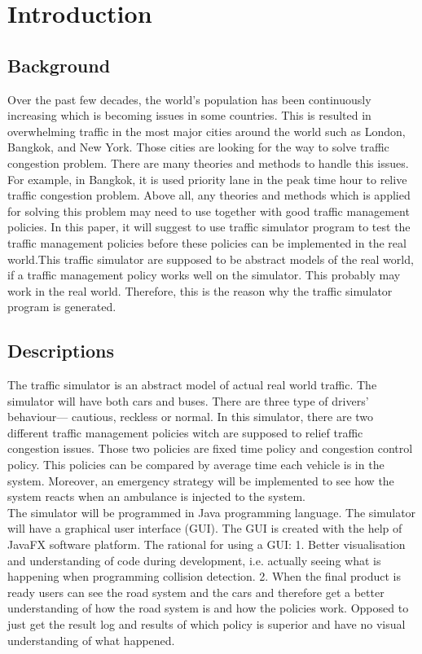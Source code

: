 \documentclass[11pt]{article}
\begin{document}
\newpage

\section{Introduction}
	\subsection{Background}
	\indent\indent Over the past few decades, the world’s population has been continuously increasing which is becoming issues in some countries. This is resulted in overwhelming traffic in the most major cities around the world such as London, Bangkok, and New York. Those cities are looking for the way to solve traffic congestion problem. There are many theories and methods to handle this issues. For example, in Bangkok, it is used priority lane in the peak time hour to relive traffic congestion problem.  Above all, any theories and methods which is applied for solving this problem may need to use together with good traffic management policies. In this paper, it will suggest to use traffic simulator program to test the traffic management policies before these policies can be implemented in the real world.This traffic simulator are supposed to be abstract models of the real world, if a traffic management policy works well on the simulator. This probably may work in the real world.  Therefore, this is the reason why the traffic simulator program is generated. 
	
	\subsection{Descriptions}
	\indent\indent The traffic simulator is an abstract model of actual real world traffic. The simulator will have both cars and buses. There are three type of drivers’ behaviour— cautious, reckless or normal. In this simulator, there are two different traffic management policies witch are supposed to relief traffic congestion issues. Those two policies are fixed time policy and congestion control policy. This policies can be compared by average time each vehicle is in the system. Moreover, an emergency strategy will be implemented to see how the system reacts when an ambulance is injected to the system.\\
	\indent The simulator will be programmed in Java programming language. The simulator will have a graphical user interface (GUI). The GUI is created with the help of JavaFX software platform. The rational for using a GUI: 1. Better visualisation and understanding of code during development, i.e. actually seeing what is happening when programming collision detection. 2. When the final product is ready users can see the road system and the cars and therefore get a better understanding of how the road system is and how the policies work. Opposed to just get the result log and results of which policy is superior and have no visual understanding of what happened. 
\end{document}
